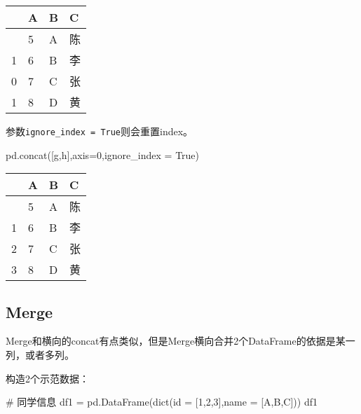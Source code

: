 \documentclass[
  letterpaper,
  DIV=11,
  numbers=noendperiod]{scrreprt}
\newenvironment{Shaded}{\begin{snugshade}}{\end{snugshade}}
\newcommand{\BuiltInTok}[1]{\textcolor[rgb]{0.00,0.23,0.31}{#1}}
\newcommand{\CommentTok}[1]{\textcolor[rgb]{0.37,0.37,0.37}{#1}}
\newcommand{\DecValTok}[1]{\textcolor[rgb]{0.68,0.00,0.00}{#1}}
\newcommand{\NormalTok}[1]{\textcolor[rgb]{0.00,0.23,0.31}{#1}}
\newcommand{\OperatorTok}[1]{\textcolor[rgb]{0.37,0.37,0.37}{#1}}
\newcommand{\StringTok}[1]{\textcolor[rgb]{0.13,0.47,0.30}{#1}}
\newcommand{\VariableTok}[1]{\textcolor[rgb]{0.07,0.07,0.07}{#1}}
\begin{document}
\begin{longtable}[]{@{}llll@{}}
\toprule\noalign{}
& A & B & C \\
\midrule\noalign{}
\endhead
\bottomrule\noalign{}
\endlastfoot
0 & 5 & A & 陈 \\
1 & 6 & B & 李 \\
0 & 7 & C & 张 \\
1 & 8 & D & 黄 \\
\end{longtable}

参数\texttt{ignore\_index\ =\ True}则会重置index。

\begin{Shaded}
\begin{Highlighting}[]
\NormalTok{pd.concat([g,h],axis}\OperatorTok{=}\DecValTok{0}\NormalTok{,ignore\_index }\OperatorTok{=} \VariableTok{True}\NormalTok{)}
\end{Highlighting}
\end{Shaded}

\begin{longtable}[]{@{}llll@{}}
\toprule\noalign{}
& A & B & C \\
\midrule\noalign{}
\endhead
\bottomrule\noalign{}
\endlastfoot
0 & 5 & A & 陈 \\
1 & 6 & B & 李 \\
2 & 7 & C & 张 \\
3 & 8 & D & 黄 \\
\end{longtable}

\hypertarget{merge}{%
\subsection{Merge}\label{merge}}

Merge和横向的concat有点类似，但是Merge横向合并2个DataFrame的依据是某一列，或者多列。

构造2个示范数据：

\begin{Shaded}
\begin{Highlighting}[]
\CommentTok{\# 同学信息}
\NormalTok{df1 }\OperatorTok{=}\NormalTok{ pd.DataFrame(}\BuiltInTok{dict}\NormalTok{(}\BuiltInTok{id} \OperatorTok{=}\NormalTok{ [}\DecValTok{1}\NormalTok{,}\DecValTok{2}\NormalTok{,}\DecValTok{3}\NormalTok{],name }\OperatorTok{=}\NormalTok{ [}\StringTok{\textquotesingle{}A\textquotesingle{}}\NormalTok{,}\StringTok{\textquotesingle{}B\textquotesingle{}}\NormalTok{,}\StringTok{\textquotesingle{}C\textquotesingle{}}\NormalTok{]))}
\NormalTok{df1}
\end{Highlighting}
\end{Shaded}
\end{document}

